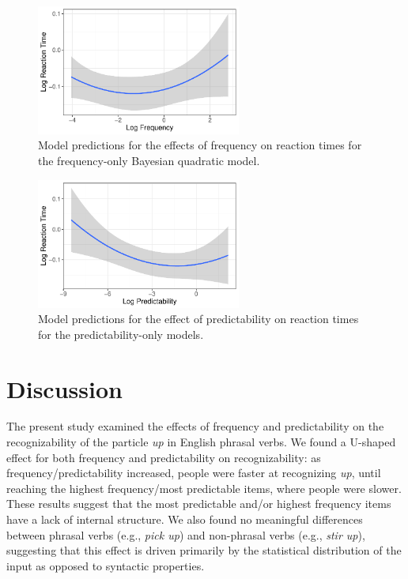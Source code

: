 \documentclass[
  authoryear,
  preprint,
  1p,
  onecolumn]{elsarticle}
\begin{document}
\begin{figure}[H]

{\centering \includegraphics[width=0.6\textwidth,height=\textheight]{quarto-writeup_files/figure-pdf/FreqOnlyPlot-1.pdf}

}

\caption{Model predictions for the effects of frequency on reaction
times for the frequency-only Bayesian quadratic model.}

\end{figure}%

\begin{figure}[H]

{\centering \includegraphics[width=0.6\textwidth,height=\textheight]{quarto-writeup_files/figure-pdf/PredicOnlyPlot-1.pdf}

}

\caption{Model predictions for the effect of predictability on reaction
times for the predictability-only models.}

\end{figure}%

\section{Discussion}\label{discussion}

The present study examined the effects of frequency and predictability
on the recognizability of the particle \emph{up} in English phrasal
verbs. We found a U-shaped effect for both frequency and predictability
on recognizability: as frequency/predictability increased, people were
faster at recognizing \emph{up}, until reaching the highest
frequency/most predictable items, where people were slower. These
results suggest that the most predictable and/or highest frequency items
have a lack of internal structure. We also found no meaningful
differences between phrasal verbs (e.g., \emph{pick up}) and non-phrasal
verbs (e.g., \emph{stir up}), suggesting that this effect is driven
primarily by the statistical distribution of the input as opposed to
syntactic properties.
\end{document}
